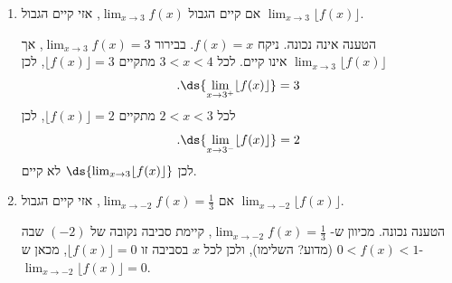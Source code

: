 \begin{enumerate}
    \item
אם    קיים הגבול
    $\displaystyle\lim_{x\to 3}f(x)$,
    אזי קיים הגבול
    $\displaystyle\lim_{x\to 3}\lfloor f(x)\rfloor$.
\ifsol
{}
\begin{solbox}
הטענה אינה נכונה.
ניקח
$f(x)=x$.
בבירור
$\displaystyle\lim_{x\to3}f(x)=3$,
אך
$\displaystyle\lim_{x\to 3}\lfloor f(x)\rfloor$
אינו קיים.
לכל
$3<x<4$
מתקיים
$\lfloor f(x)\rfloor=3$,
לכן
$$.\ds{\lim_{x\to3^+}\lfloor f(x)\rfloor}=3$$
לכל
$2<x<3$
מתקיים
$\lfloor f(x)\rfloor=2$,
לכן
$$.\ds{\lim_{x\to3^-}\lfloor f(x)\rfloor}=2$$
לכן
$\ds{\lim_{x\to3}\lfloor f(x)\rfloor}$
לא קיים.
\end{solbox}
\fi

\item
אם
$\displaystyle\lim_{x\to -2}f(x)=\frac{1}{3}$,
    אזי קיים הגבול
    $\displaystyle\lim_{x\to -2}\lfloor f(x)\rfloor$.
\ifsol
{}
\begin{solbox}
הטענה נכונה.
מכיוון ש-
$\displaystyle\lim_{x\to-2}f(x)=\tfrac{1}{3}$,
קיימת סביבה נקובה של
$(-2)$
שבה
$0<f(x)<1$
(מדוע? השלימו),
ולכן לכל
$x$
בסביבה זו
$\lfloor f(x)\rfloor=0$,
מכאן ש-
$\displaystyle\lim_{x\to-2}\lfloor f(x)\rfloor=0$.
\end{solbox}
\fi
\end{enumerate}
